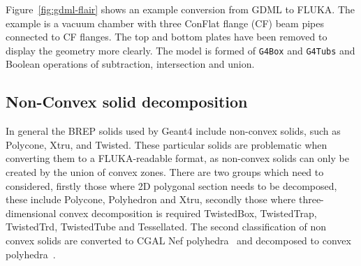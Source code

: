 \documentclass[final,5p,times,twocolumn]{elsarticle}
\begin{document}
Figure~\ref{fig:gdml-flair} shows an example conversion from GDML to FLUKA. The example is a 
vacuum chamber with three ConFlat flange (CF) beam pipes connected to CF flanges. The top and bottom plates 
have been removed to display the geometry more clearly. The model is formed of \verb|G4Box| and
\verb|G4Tubs| and Boolean operations of subtraction, intersection and union.

\subsection{Non-Convex solid decomposition}
In general the BREP solids used by Geant4 include non-convex solids, such as  Polycone, Xtru, and Twisted.  These 
particular solids are problematic when converting them to a FLUKA-readable format, as non-convex solids 
can only be created by the union of convex zones. There are two groups which need to considered, firstly those 
where 2D polygonal section needs to be decomposed, these include Polycone, Polyhedron and Xtru, secondly 
those where three-dimensional convex decomposition is required  TwistedBox, TwistedTrap, TwistedTrd, 
TwistedTube and Tessellated. The second classification of non convex solids are converted to CGAL 
Nef polyhedra~\cite{cgal:hk-bonp3-20b} and decomposed to convex polyhedra~\cite{cgal:h-emspe-20b}.
\end{document}
